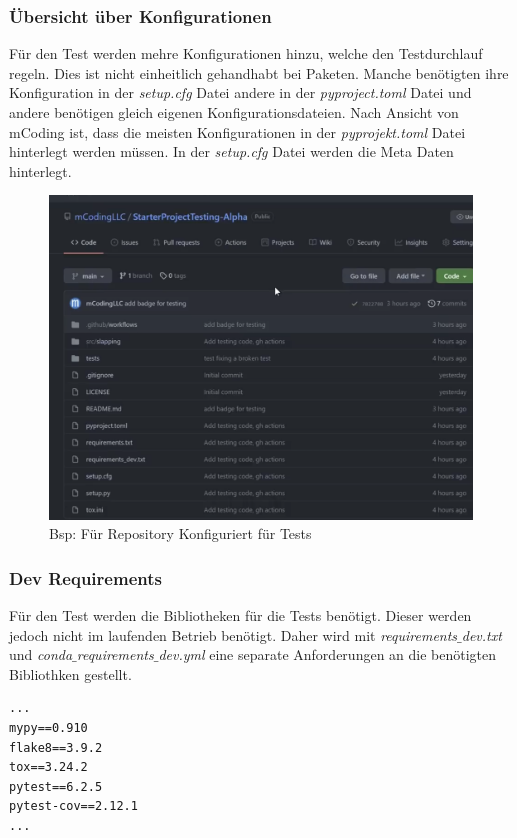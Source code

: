 \subsubsection{Übersicht über Konfigurationen}
Für den Test werden mehre Konfigurationen hinzu, welche den Testdurchlauf regeln. Dies ist nicht einheitlich gehandhabt bei Paketen. Manche benötigten ihre Konfiguration in der \textit{setup.cfg} Datei andere in der \textit{pyproject.toml} Datei und andere benötigen gleich eigenen Konfigurationsdateien. Nach Ansicht von mCoding ist, dass die meisten Konfigurationen in der \textit{pyprojekt.toml} Datei hinterlegt werden müssen. In der \textit{setup.cfg} Datei werden die Meta Daten hinterlegt.

\begin{figure}[H]
	\centering
	\includegraphics[scale = 0.2]{attachment/chapter_2/Scc066}
	\caption{Bsp: Für Repository Konfiguriert für Tests}
\end{figure}

\subsubsection{Dev Requirements} Für den Test werden die Bibliotheken für die Tests benötigt. Dieser werden jedoch nicht im laufenden Betrieb benötigt. Daher wird mit \textit{requirements}$\_$\textit{dev.txt} und \textit{conda}$\_$\textit{requirements}$\_$\textit{dev.yml} eine separate Anforderungen an die benötigten Bibliothken gestellt.

\begin{lstlisting}[style=Config, caption={Bsp. requirements\_dev.txt; Paket Requirments für Tests}, captionpos=b]
...
mypy==0.910
flake8==3.9.2
tox==3.24.2
pytest==6.2.5
pytest-cov==2.12.1
...
\end{lstlisting}

